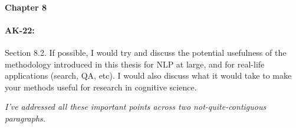 \documentclass[11pt,a4paper]{article}
\newcommand{\res}[1]{\vspace{0.25cm} \begin{adjustwidth}{1cm}{}\emph{#1}\end{adjustwidth}}
\begin{document}
\paragraph{Chapter 8}

\paragraph{AK-22:} Section 8.2. If possible, I would try and discuss the potential usefulness of the methodology introduced in this thesis for NLP at large, and for real-life applications (search, QA, etc). I would also discuss what it would take to make your methods useful for research in cognitive science.

\res{I've addressed all these important points across two not-quite-contiguous paragraphs.}
\end{document}
